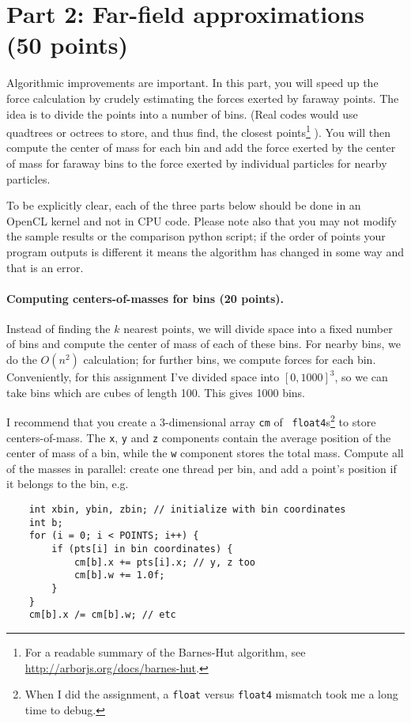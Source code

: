 \documentclass[letterpaper,10pt]{article}
\begin{document}
\section*{Part 2: Far-field approximations (50 points)}

Algorithmic improvements are important. In this part, you will
speed up the force calculation by crudely estimating the forces
exerted by faraway points. The idea is to divide the points into a
number of bins. (Real codes would use quadtrees or octrees to store,
and thus find, the closest points\footnote{For a readable summary
of the Barnes-Hut algorithm, see \url{http://arborjs.org/docs/barnes-hut}.}
). You will then compute the center
of mass for each bin and add the force exerted by the center of mass
for faraway bins to the force exerted by individual particles for
nearby particles.

To be explicitly clear, each of the three parts below should be done in an OpenCL kernel and not in CPU code. Please note also that you may not modify the sample results or the comparison python script; if the order of points your program outputs is different it means the algorithm has changed in some way and that is an error.

\paragraph{Computing centers-of-masses for bins (20 points).}
Instead of finding the $k$ nearest points, we will divide space into a
fixed number of bins and compute the center of mass of each of these
bins. For nearby bins, we do the $O(n^2)$ calculation; for further
bins, we compute forces for each bin. Conveniently, for this assignment
I've divided space into $[0, 1000]^3$, so we can take bins which are
cubes of length 100. This gives 1000 bins.

I recommend that you create a 3-dimensional array {\tt cm} of {\tt
  float4}s\footnote{When I did the assignment, a {\tt float} versus {\tt float4}
mismatch took me a long time to debug.} to store centers-of-mass. The {\tt x}, {\tt y} and {\tt z}
components contain the average position of the center of mass of a
bin, while the {\tt w} component stores the total mass. Compute all of
the masses in parallel: create one thread per bin, and add a point's
position if it belongs to the bin, e.g.

{\small
\begin{verbatim}
    int xbin, ybin, zbin; // initialize with bin coordinates
    int b;
    for (i = 0; i < POINTS; i++) {
        if (pts[i] in bin coordinates) {
            cm[b].x += pts[i].x; // y, z too
            cm[b].w += 1.0f;
        }
    }
    cm[b].x /= cm[b].w; // etc
\end{verbatim}
}
\end{document}
